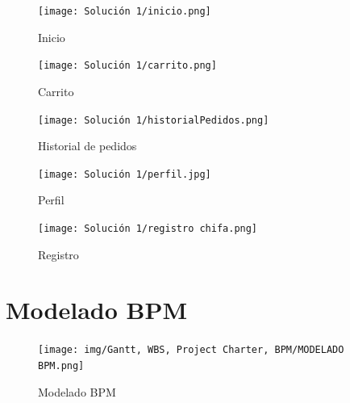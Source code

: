 \documentclass{article}
\begin{document}
\begin{doublespace}
    \begin{figure}[H]
        \centering
        \vspace*{1cm}
        \texttt{[image: Solución 1/inicio.png]}
        \caption{Inicio}
        \label{fig:Inicio}
    \end{figure}
    \begin{figure}[H]
        \centering
        \vspace*{1cm}
        \texttt{[image: Solución 1/carrito.png]}
        \caption{Carrito}
        \label{fig:Carrito}
    \end{figure}
    \begin{figure}[H]
        \centering
        \vspace*{1cm}
        \texttt{[image: Solución 1/historialPedidos.png]}
        \caption{Historial de pedidos}
        \label{fig:Historial-Pedidos}
    \end{figure}
    \begin{figure}[H]
        \centering
        \vspace*{1cm}
        \texttt{[image: Solución 1/perfil.jpg]}
        \caption{Perfil}
        \label{fig:Perfil}
    \end{figure}
    \begin{figure}[H]
        \centering
        \vspace*{1cm}
        \texttt{[image: Solución 1/registro chifa.png]}
        \caption{Registro}
        \label{fig:Registro}
    \end{figure}

    \section{Modelado BPM}
    \begin{itemize}
        \begin{figure}[H]
            \centering
            \vspace*{1cm}
            \texttt{[image: img/Gantt, WBS, Project Charter, BPM/MODELADO BPM.png]}
            \caption{Modelado BPM}
            \label{fig:Modelado-BPM}
        \end{figure}
    \end{itemize}


\end{doublespace}
\end{document}
